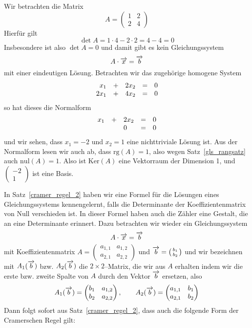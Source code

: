 \begin{beispiel} Wir betrachten die Matrix
  	$$ A = \left( \begin{matrix} 1 & 2 \\ 2 & 4  \end{matrix} \right) $$
Hierfür gilt
  	$$ \det{A} = 1 \cdot 4 - 2 \cdot 2 = 4 - 4 = 0 $$
Insbesondere ist also $\det{A} = 0$ und damit gibt es kein Gleichungssystem 
  	$$  A  \cdot \overrightarrow{x} = \overrightarrow{b} $$ 
mit einer eindeutigen Lösung. Betrachten wir das zugehörige homogene System
  	$$ \begin{array} {r c l c l}
   	x_1 & + &  2 x_2 & = & 0 \\
   	2x_1 & + &  4 x_2 & = & 0 
   	\end{array} $$
so hat dieses die Normalform 
  	$$ \begin{array} {r c l c l}
   	x_1 & + & 2 x_2 & = & 0 \\
     	&   &  0 & = & 0 
   	\end{array} $$
und wir sehen, dass $x_1 = -2$ und $x_2 = 1$ eine nichttriviale Lösung ist. Aus der Normalform 
lesen wir auch ab, dass $\mathrm{rg}(A) = 1$, also wegen Satz~\ref{gls_rangsatz} auch $\mathrm{nul}(A) = 1$. 
Also ist $\mathrm{Ker}(A)$ eine Vektorraum der Dimension 1, und $\left( \begin{smallmatrix} -2 \\ 1 
\end{smallmatrix} \right)$ ist eine Basis.
\end{beispiel}

\bigbreak

In Satz~\ref{cramer_regel_2} haben wir eine Formel für die Lösungen eines Gleichungssystems kennengelernt, 
falls die Determinante der Koeffizientenmatrix von Null verschieden ist. In dieser Formel haben auch die 
Zähler eine Gestalt, die an eine Determinante erinnert. Dazu betrachten wir wieder ein Gleichungssystem
  	$$ A  \cdot \overrightarrow{x} = \overrightarrow{b} $$ 
mit Koeffizientenmatrix $A = \left( \begin{smallmatrix} a_{1,1} & a_{1,2} \\ a_{2,1} & a_{2,2}
\end{smallmatrix} \right)$ und $\overrightarrow{b} = \left( \begin{smallmatrix} b_1 \\ b_2
\end{smallmatrix} \right)$ und wir bezeichnen mit $A_1(\overrightarrow{b})$ bzw. $A_2(\overrightarrow{b})$ 
die $2 \times 2$--Matrix, die wir aus $A$ erhalten indem wir die erste bzw. zweite Spalte von $A$ durch den 
Vektor $\overrightarrow{b}$ ersetzen, also
  	$$ A_1(\overrightarrow{b}) =  \left( \begin{matrix} b_1 & a_{1,2} \\ b_2 & a_{2,2} \end{matrix} \right), \qquad 
	A_2(\overrightarrow{b}) =  \left( \begin{matrix} a_{1,1} & b_1 \\ a_{2,1} & b_2 \end{matrix} \right) $$
Dann folgt sofort aus Satz~\ref{cramer_regel_2}, dass auch die folgende Form der Cramerschen Regel gilt:

